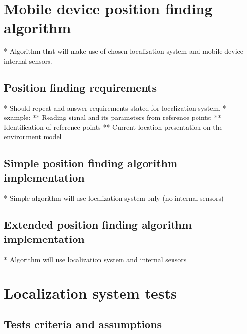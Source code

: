 \documentclass[../main.tex]{subfiles}
\begin{document}
\chapter{Mobile device position finding algorithm}
* Algorithm that will make use of chosen localization system and mobile device internal sensors.

\section{Position finding requirements} %
\label{sec:position_finding_requirements}

* Should repeat and answer requirements stated for localization system.
* example:
** Reading signal and its parameters from reference points;
** Identification of reference points
** Current location presentation on the environment model



\section{Simple position finding algorithm implementation} %
\label{sec:simple_position_finding_algorithm_implementation}

* Simple algorithm will use localization system only (no internal sensors)


\section{Extended position finding algorithm implementation} %
\label{sec:extended_position_finding_algorithm_implementation}

* Algorithm will use localization system and internal sensors


\chapter{Localization system tests}

\section{Tests criteria and assumptions} %
\label{sec:tests_criteria_and_assumptions}
\end{document}
